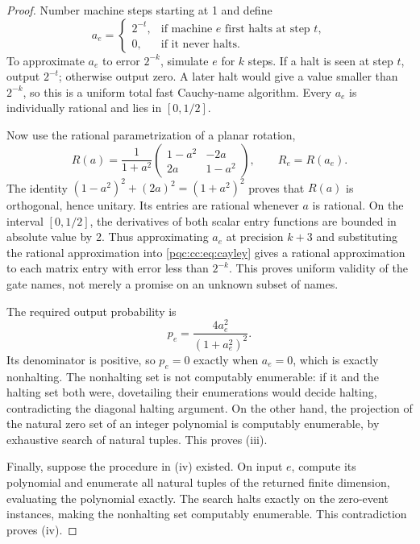 \documentclass[11pt,letterpaper]{article}
\numberwithin{equation}{section}
\theoremstyle{definition}
\theoremstyle{remark}
\begin{document}
\begin{proof}
Number machine steps starting at 1 and define
\begin{equation}
 a_e=\begin{cases}
 2^{-t},&\text{if machine $e$ first halts at step }t,\\
 0,&\text{if it never halts}.
 \end{cases}
\label{pqc:cc:eq:haltingreal}
\end{equation}
To approximate $a_e$ to error $2^{-k}$, simulate $e$ for $k$ steps. If a halt
is seen at step $t$, output $2^{-t}$; otherwise output zero. A later halt
would give a value smaller than $2^{-k}$, so this is a uniform total fast
Cauchy-name algorithm. Every $a_e$ is individually rational and lies in
$[0,1/2]$.

Now use the rational parametrization of a planar rotation,
\begin{equation}
 R(a)=\frac1{1+a^2}
 \begin{pmatrix}1-a^2&-2a\\2a&1-a^2\end{pmatrix},
 \qquad R_e=R(a_e).
\label{pqc:cc:eq:cayley}
\end{equation}
The identity $(1-a^2)^2+(2a)^2=(1+a^2)^2$ proves that $R(a)$ is orthogonal,
hence unitary. Its entries are rational whenever $a$ is rational. On the
interval $[0,1/2]$, the derivatives of both scalar entry functions are bounded
in absolute value by 2. Thus approximating $a_e$ at precision $k+3$ and
substituting the rational approximation into \eqref{pqc:cc:eq:cayley} gives a rational
approximation to each matrix entry with error less than $2^{-k}$. This proves
uniform validity of the gate names, not merely a promise on an unknown subset
of names.

The required output probability is
\begin{equation}
 p_e=\frac{4a_e^2}{(1+a_e^2)^2}.
\label{pqc:cc:eq:cayleyprob}
\end{equation}
Its denominator is positive, so $p_e=0$ exactly when $a_e=0$, which is exactly
nonhalting. The nonhalting set is not computably enumerable: if it and the
halting set both were, dovetailing their enumerations would decide halting,
contradicting the diagonal halting argument. On the other hand, the projection
of the natural zero set of an integer polynomial is computably enumerable,
by exhaustive search of natural tuples. This proves (iii).

Finally, suppose the procedure in (iv) existed. On input $e$, compute its
polynomial and enumerate all natural tuples of the returned finite dimension,
evaluating the polynomial exactly. The search halts exactly on the zero-event
instances, making the nonhalting set computably enumerable. This contradiction
proves (iv).
\end{proof}
\end{document}
